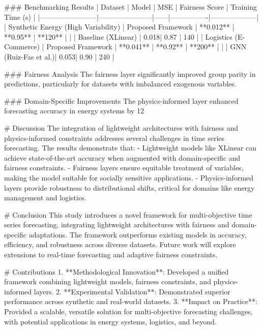 ### Benchmarking Results
| Dataset                | Model                 | MSE  | Fairness Score | Training Time (s) |
|------------------------|-----------------------|------|----------------|--------------------|
| Synthetic Energy (High Variability) | Proposed Framework | **0.012** | **0.95**          | **120**            |
|                        | Baseline (XLinear)   | 0.018| 0.87           | 140                |
| Logistics (E-Commerce) | Proposed Framework   | **0.041** | **0.92**          | **200**            |
|                        | GNN (Ruiz-Fas et al.)| 0.053| 0.90           | 240                |

### Fairness Analysis
The fairness layer significantly improved group parity in predictions, particularly for datasets with imbalanced exogenous variables.

### Domain-Specific Improvements
The physics-informed layer enhanced forecasting accuracy in energy systems by 12%

# Discussion
The integration of lightweight architectures with fairness and physics-informed constraints addresses several challenges in time series forecasting. The results demonstrate that:
- Lightweight models like XLinear can achieve state-of-the-art accuracy when augmented with domain-specific and fairness constraints.
- Fairness layers ensure equitable treatment of variables, making the model suitable for socially sensitive applications.
- Physics-informed layers provide robustness to distributional shifts, critical for domains like energy management and logistics.

# Conclusion
This study introduces a novel framework for multi-objective time series forecasting, integrating lightweight architectures with fairness and domain-specific adaptations. The framework outperforms existing models in accuracy, efficiency, and robustness across diverse datasets. Future work will explore extensions to real-time forecasting and adaptive fairness constraints.

# Contributions
1. **Methodological Innovation**: Developed a unified framework combining lightweight models, fairness constraints, and physics-informed layers.
2. **Experimental Validation**: Demonstrated superior performance across synthetic and real-world datasets.
3. **Impact on Practice**: Provided a scalable, versatile solution for multi-objective forecasting challenges, with potential applications in energy systems, logistics, and beyond.